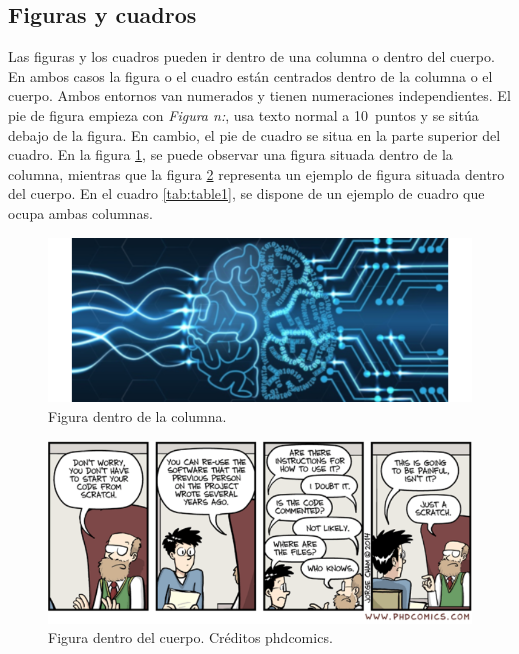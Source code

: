 \documentclass[twocolumn,twoside,a4paper, 10pt]{IEEEtran}
\begin{document}
\subsection{Figuras y cuadros}

Las figuras y los cuadros pueden ir dentro de una columna o dentro del cuerpo. En ambos casos la figura o el cuadro están centrados dentro de la columna o el cuerpo. Ambos entornos van numerados y tienen numeraciones independientes. El pie de figura empieza con \emph{Figura n:}, usa texto normal a 10~puntos y se sitúa debajo de la figura. En cambio, el pie de cuadro se situa en la parte superior del cuadro. En la figura \ref{fig:fig1}, se puede observar una figura situada dentro de la columna, mientras que la figura \ref{fig:fig2} representa un ejemplo de figura situada dentro del cuerpo. En el cuadro \ref{tab:table1}, se dispone de un ejemplo de cuadro que ocupa ambas columnas.

\begin{figure}
\begin{center}
	\includegraphics[width = \linewidth]{figures/logo-MUSI.png}
\end{center}
\caption{Figura dentro de la columna.} \label{fig:fig1}
\end{figure}

\begin{figure}
\begin{center}
	\includegraphics[width = \linewidth]{figures/fig2.png}
\end{center}
\caption{Figura dentro del cuerpo. Créditos phdcomics.} \label{fig:fig2}
\end{figure}
\end{document}
